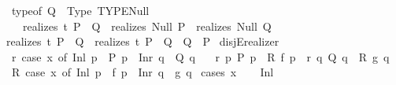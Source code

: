 \begin{isabellebody}
\ \ \ typeof\ Q\ {\isasymequiv}\ Type\ {\isacharparenleft}{\kern0pt}TYPE{\isacharparenleft}{\kern0pt}Null{\isacharparenright}{\kern0pt}{\isacharparenright}{\kern0pt}\ {\isasymLongrightarrow}\isanewline
\ \ \ \ \ realizes\ t\ {\isacharparenleft}{\kern0pt}P\ {\isacharequal}{\kern0pt}\ Q{\isacharparenright}{\kern0pt}\ {\isasymequiv}\ realizes\ Null\ P\ {\isacharequal}{\kern0pt}\ realizes\ Null\ Q{\isachardoublequoteclose}\isanewline
\isanewline
\ \ {\isachardoublequoteopen}{\isacharparenleft}{\kern0pt}realizes\ t\ {\isacharparenleft}{\kern0pt}P\ {\isacharequal}{\kern0pt}\ Q{\isacharparenright}{\kern0pt}{\isacharparenright}{\kern0pt}\ {\isasymequiv}\ {\isacharparenleft}{\kern0pt}realizes\ t\ {\isacharparenleft}{\kern0pt}{\isacharparenleft}{\kern0pt}P\ {\isasymlongrightarrow}\ Q{\isacharparenright}{\kern0pt}\ {\isasymand}\ {\isacharparenleft}{\kern0pt}Q\ {\isasymlongrightarrow}\ P{\isacharparenright}{\kern0pt}{\isacharparenright}{\kern0pt}{\isacharparenright}{\kern0pt}{\isachardoublequoteclose}%
\isadelimdocument
%
\endisadelimdocument
%
\isatagdocument
%
\isamarkuptrue%
%
\endisatagdocument
{\isafolddocument}%
%
\isadelimdocument
%
\endisadelimdocument
{}\isamarkupfalse%
\ disjE{\isacharunderscore}{\kern0pt}realizer{\isacharcolon}{\kern0pt}\isanewline
\ \ \ r{\isacharcolon}{\kern0pt}\ {\isachardoublequoteopen}case\ x\ of\ Inl\ p\ {\isasymRightarrow}\ P\ p\ {\isacharbar}{\kern0pt}\ Inr\ q\ {\isasymRightarrow}\ Q\ q{\isachardoublequoteclose}\isanewline
\ \ \ r{}{\isacharcolon}{\kern0pt}\ {\isachardoublequoteopen}{\isasymAnd}p{\isachardot}{\kern0pt}\ P\ p\ {\isasymLongrightarrow}\ R\ {\isacharparenleft}{\kern0pt}f\ p{\isacharparenright}{\kern0pt}{\isachardoublequoteclose}\ \ r{}{\isacharcolon}{\kern0pt}\ {\isachardoublequoteopen}{\isasymAnd}q{\isachardot}{\kern0pt}\ Q\ q\ {\isasymLongrightarrow}\ R\ {\isacharparenleft}{\kern0pt}g\ q{\isacharparenright}{\kern0pt}{\isachardoublequoteclose}\isanewline
\ \ \ {\isachardoublequoteopen}R\ {\isacharparenleft}{\kern0pt}case\ x\ of\ Inl\ p\ {\isasymRightarrow}\ f\ p\ {\isacharbar}{\kern0pt}\ Inr\ q\ {\isasymRightarrow}\ g\ q{\isacharparenright}{\kern0pt}{\isachardoublequoteclose}\isanewline
%
\isadelimproof
%
\endisadelimproof
%
\isatagproof
{}\isamarkupfalse%
\ {\isacharparenleft}{\kern0pt}cases\ x{\isacharparenright}{\kern0pt}\isanewline
\ \ \isamarkupfalse%
\ Inl\isanewline
\ \ \isamarkupfalse%

\end{isabellebody}
